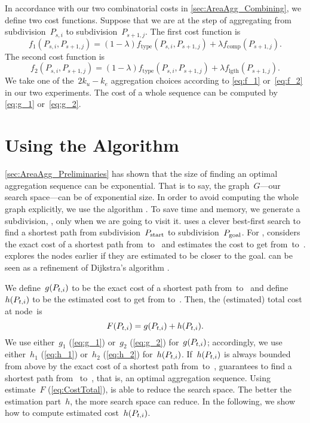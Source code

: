 In accordance with our two combinatorial costs in 
\sect\ref{sec:AreaAgg_Combining},
we define two cost functions.
Suppose that we are at the step of aggregating 
from subdivision~$P_{s,i}$ to subdivision~$P_{s+1,j}$.
The first cost function is 
\begin{equation}
\label{eq:f_1}
f_1(P_{s,i},P_{s+1,j})=
(1-\lambda)f_\mathrm{type}(P_{s,i},P_{s+1,j})
+\lambda f_{\mathrm{comp}}(P_{s+1,j}).
\end{equation}
The second cost function is
\begin{equation}
\label{eq:f_2}
f_2(P_{s,i},P_{s+1,j})=
(1-\lambda)f_\mathrm{type}(P_{s,i},P_{s+1,j})
+\lambda f_{\mathrm{lgth}}(P_{s+1,j}).
\end{equation}
We take one of the~$2k_u - k_e$ aggregation choices 
according to \eqs\ref{eq:f_1} or~\ref{eq:f_2}
in our two experiments.
The cost of a whole sequence can be computed by
\eqs\ref{eq:g_1} or~\ref{eq:g_2}.







\section{Using the \texorpdfstring{\Astar Algorithm}{A* Algorithm}}
\label{sec:AreaAgg_AStar}

\sect\ref{sec:AreaAgg_Preliminaries} has shown that
the size of finding an optimal aggregation sequence 
can be exponential.
That is to say, the graph~$G$---our search space---can 
be of exponential size.
In order to avoid computing the whole graph explicitly,
we use the \Astar algorithm \parencite{Hart1968,PatelAStar}.
To save time and memory, 
we generate a subdivision, \Pnode, only 
when we are going to visit it.
\Astar uses a clever best-first search 
to find a shortest path 
from subdivision~$P_\mathrm{start}$ to subdivision~$P_\mathrm{goal}$.  
For \Pnode,
\Astar considers the exact cost of a shortest path 
from~\Pstart to~\Pnode 
and estimates the cost to get from~\Pnode to~\Pgoal. 
\Astar explores the nodes earlier 
if they are estimated to be closer to the goal.
\Astar can be seen as a refinement of Dijkstra's algorithm
\parencite{Dijkstra1959}.

We define~$g(P_{t,i})$ to be 
the exact cost of a shortest path from~\Pstart to~\Pnode 
and define~$h(P_{t,i})$ to be the estimated cost 
to get from \Pnode to~\Pgoal. 
Then, the (estimated) total cost at node~\Pnode is
\begin{equation}
\label{eq:CostTotal}
F(P_{t,i})=g(P_{t,i})+h(P_{t,i}).
\end{equation}
We use either~$g_1$ (\eq\ref{eq:g_1}) 
or~$g_2$ (\eq\ref{eq:g_2}) for~$g(P_{t,i})$;
accordingly, we use either~$h_1$ (\eq\ref{eq:h_1}) 
or~$h_2$ (\eq\ref{eq:h_2}) for~$h(P_{t,i})$.
If~$h(P_{t,i})$ is always bounded from above 
by the exact cost of a shortest path from~\Pnode to~\Pgoal, 
\Astar guarantees to find a shortest path from~\Pstart 
to~\Pgoal, 
that is, an optimal aggregation sequence.  
Using estimate~$F$ (\eq\ref{eq:CostTotal}), 
\Astar is able to reduce the search space.
The better the estimation part~$h$, 
the more search space \Astar can reduce.
In the following, we show how to compute
estimated cost~$h(P_{t,i})$.

